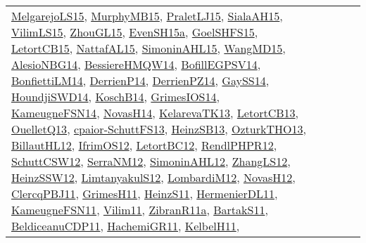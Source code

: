 {\begin{longtable}{lp{3cm}>{\raggedright}p{6cm}>{\raggedright}p{6cm}p{8cm}}
\href{papers/MelgarejoLS15.pdf}{MelgarejoLS15}\cite{MelgarejoLS15}, \href{papers/MurphyMB15.pdf}{MurphyMB15}\cite{MurphyMB15}, \href{papers/PraletLJ15.pdf}{PraletLJ15}\cite{PraletLJ15}, \href{papers/SialaAH15.pdf}{SialaAH15}\cite{SialaAH15}, \href{papers/VilimLS15.pdf}{VilimLS15}\cite{VilimLS15}, \href{papers/ZhouGL15.pdf}{ZhouGL15}\cite{ZhouGL15}, \href{articles/EvenSH15a.pdf}{EvenSH15a}\cite{EvenSH15a}, \href{articles/GoelSHFS15.pdf}{GoelSHFS15}\cite{GoelSHFS15}, \href{articles/LetortCB15.pdf}{LetortCB15}\cite{LetortCB15}, \href{articles/NattafAL15.pdf}{NattafAL15}\cite{NattafAL15}, \href{articles/SimoninAHL15.pdf}{SimoninAHL15}\cite{SimoninAHL15}, \href{articles/WangMD15.pdf}{WangMD15}\cite{WangMD15}, \href{papers/AlesioNBG14.pdf}{AlesioNBG14}\cite{AlesioNBG14}, \href{papers/BessiereHMQW14.pdf}{BessiereHMQW14}\cite{BessiereHMQW14}, \href{papers/BofillEGPSV14.pdf}{BofillEGPSV14}\cite{BofillEGPSV14}, \href{papers/BonfiettiLM14.pdf}{BonfiettiLM14}\cite{BonfiettiLM14}, \href{papers/DerrienP14.pdf}{DerrienP14}\cite{DerrienP14}, \href{papers/DerrienPZ14.pdf}{DerrienPZ14}\cite{DerrienPZ14}, \href{papers/GaySS14.pdf}{GaySS14}\cite{GaySS14}, \href{papers/HoundjiSWD14.pdf}{HoundjiSWD14}\cite{HoundjiSWD14}, \href{papers/KoschB14.pdf}{KoschB14}\cite{KoschB14}, \href{articles/GrimesIOS14.pdf}{GrimesIOS14}\cite{GrimesIOS14}, \href{articles/KameugneFSN14.pdf}{KameugneFSN14}\cite{KameugneFSN14}, \href{articles/NovasH14.pdf}{NovasH14}\cite{NovasH14}, \href{papers/KelarevaTK13.pdf}{KelarevaTK13}\cite{KelarevaTK13}, \href{papers/LetortCB13.pdf}{LetortCB13}\cite{LetortCB13}, \href{papers/OuelletQ13.pdf}{OuelletQ13}\cite{OuelletQ13}, \href{papers/cpaior-SchuttFS13.pdf}{cpaior-SchuttFS13}\cite{cpaior-SchuttFS13}, \href{articles/HeinzSB13.pdf}{HeinzSB13}\cite{HeinzSB13}, \href{articles/OzturkTHO13.pdf}{OzturkTHO13}\cite{OzturkTHO13}, \href{papers/BillautHL12.pdf}{BillautHL12}\cite{BillautHL12}, \href{papers/IfrimOS12.pdf}{IfrimOS12}\cite{IfrimOS12}, \href{papers/LetortBC12.pdf}{LetortBC12}\cite{LetortBC12}, \href{papers/RendlPHPR12.pdf}{RendlPHPR12}\cite{RendlPHPR12}, \href{papers/SchuttCSW12.pdf}{SchuttCSW12}\cite{SchuttCSW12}, \href{papers/SerraNM12.pdf}{SerraNM12}\cite{SerraNM12}, \href{papers/SimoninAHL12.pdf}{SimoninAHL12}\cite{SimoninAHL12}, \href{papers/ZhangLS12.pdf}{ZhangLS12}\cite{ZhangLS12}, \href{articles/HeinzSSW12.pdf}{HeinzSSW12}\cite{HeinzSSW12}, \href{articles/LimtanyakulS12.pdf}{LimtanyakulS12}\cite{LimtanyakulS12}, \href{articles/LombardiM12.pdf}{LombardiM12}\cite{LombardiM12}, \href{articles/NovasH12.pdf}{NovasH12}\cite{NovasH12}, \href{papers/ClercqPBJ11.pdf}{ClercqPBJ11}\cite{ClercqPBJ11}, \href{papers/GrimesH11.pdf}{GrimesH11}\cite{GrimesH11}, \href{papers/HeinzS11.pdf}{HeinzS11}\cite{HeinzS11}, \href{papers/HermenierDL11.pdf}{HermenierDL11}\cite{HermenierDL11}, \href{papers/KameugneFSN11.pdf}{KameugneFSN11}\cite{KameugneFSN11}, \href{papers/Vilim11.pdf}{Vilim11}\cite{Vilim11}, \href{papers/ZibranR11a.pdf}{ZibranR11a}\cite{ZibranR11a}, \href{articles/BartakS11.pdf}{BartakS11}\cite{BartakS11}, \href{articles/BeldiceanuCDP11.pdf}{BeldiceanuCDP11}\cite{BeldiceanuCDP11}, \href{articles/HachemiGR11.pdf}{HachemiGR11}\cite{HachemiGR11}, \href{articles/KelbelH11.pdf}{KelbelH11}\cite{KelbelH11}, 
\end{longtable}}
